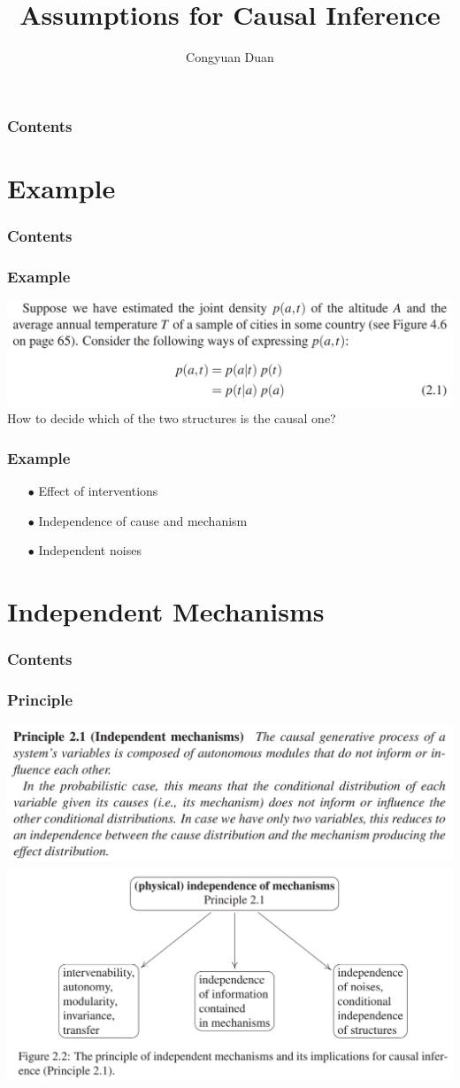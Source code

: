 \documentclass{beamer}
\title{Assumptions for Causal Inference}
\author{Congyuan Duan}
\begin{document}
\frame{\titlepage}

\begin{frame}
    \frametitle{Contents}
    \tableofcontents
\end{frame}

\section{Example}

\begin{frame}
    \frametitle{Contents}
    \tableofcontents[currentsection]
\end{frame}

\begin{frame}
    \frametitle{Example}
    \includegraphics[scale=0.6]{fig3.png}
    How to decide which of the two structures is the causal one? 
\end{frame}

\begin{frame}
    \frametitle{Example}

    \begin{itemize}
        \item[$\bullet$] Effect of interventions
        \item[$\bullet$] Independence of cause and mechanism 
        \item[$\bullet$] Independent noises
    \end{itemize}
\end{frame}

\section{Independent Mechanisms}

\begin{frame}
    \frametitle{Contents}
    \tableofcontents[currentsection]
\end{frame}

\begin{frame}
    \frametitle{Principle}
    \includegraphics[scale=0.6]{fig1.png}
    \includegraphics[scale=0.6]{fig2.png}
\end{frame}
\end{document}
